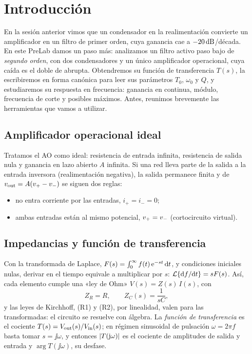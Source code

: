 \section{Introducción}\label{sec:introduccion}
En la sesión anterior vimos que un condensador en la realimentación convierte un amplificador en un
filtro de primer orden, cuya ganancia cae a $-20\,\mathrm{dB}$/década. En este PreLab damos un paso más:
analizamos un filtro activo paso bajo de \emph{segundo orden}, con dos condensadores y un único
amplificador operacional, cuya caída es el doble de abrupta. Obtendremos su función de transferencia
$T(s)$, la escribiremos en forma canónica para leer sus parámetros $T_0$, $\omega_0$ y $Q$, y estudiaremos
su respuesta en frecuencia: ganancia en continua, módulo, frecuencia de corte y posibles máximos.
Antes, reunimos brevemente las herramientas que vamos a utilizar.

\subsection{Amplificador operacional ideal}
Tratamos el AO como ideal: resistencia de entrada infinita, resistencia de salida nula y ganancia en lazo
abierto $A$ infinita. Si una red lleva parte de la salida a la entrada inversora (realimentación negativa),
la salida permanece finita y de $v_{\mathrm{out}}=A(v_{+}-v_{-})$ se siguen dos reglas:
\begin{itemize}[leftmargin=3em]
  \item[(R1)] no entra corriente por las entradas, $i_+=i_-=0$;
  \item[(R2)] ambas entradas están al mismo potencial, $v_{+}=v_{-}$ (cortocircuito virtual).
\end{itemize}

\subsection{Impedancias y función de transferencia}
Con la transformada de Laplace, $F(s)=\int_0^\infty f(t)\,\mathrm{e}^{-st}\,\mathrm{d} t$, y condiciones iniciales nulas,
derivar en el tiempo equivale a multiplicar por $s$: $\mathcal{L}\{\mathrm{d} f/\mathrm{d} t\}=sF(s)$. Así, cada elemento cumple una
«ley de Ohm» $V(s)=Z(s)\,I(s)$, con
\[
  Z_R=R,\qquad Z_C(s)=\frac{1}{sC},
\]
y las leyes de Kirchhoff, (R1) y (R2), por linealidad, valen para las transformadas: el circuito se resuelve
con álgebra. La \emph{función de transferencia} es el cociente $T(s)=V_{\mathrm{out}}(s)/V_{\mathrm{in}}(s)$; en régimen sinusoidal de
pulsación $\omega=2\pi f$ basta tomar $s=\jj\omega$, y entonces $\lvert T(\mathrm{j}\omega)\rvert$ es el cociente de amplitudes de
salida y entrada y $\arg T(\jj\omega)$, su desfase.

